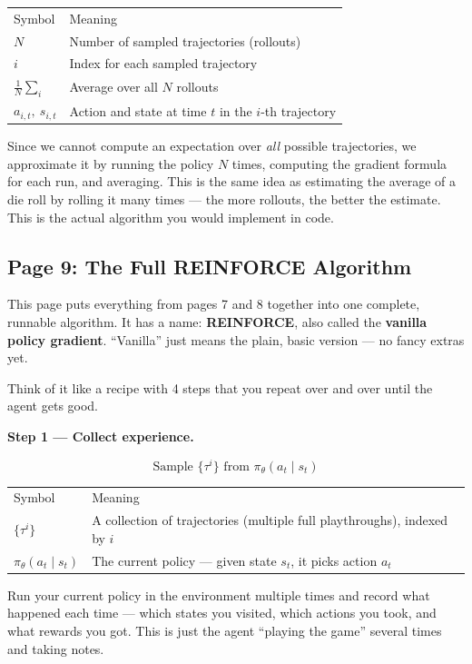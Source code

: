 \begin{tabular}{ll}
  Symbol & Meaning \\[4pt]
  $N$ & Number of sampled trajectories (rollouts) \\
  $i$ & Index for each sampled trajectory \\
  $\frac{1}{N}\sum_i$ & Average over all $N$ rollouts \\
  $a_{i,t},\ s_{i,t}$ & Action and state at time $t$ in the $i$-th trajectory \\
\end{tabular}

\medskip
Since we cannot compute an expectation over \textit{all} possible trajectories, we approximate
it by running the policy $N$ times, computing the gradient formula for each run, and averaging.
This is the same idea as estimating the average of a die roll by rolling it many times --- the
more rollouts, the better the estimate. This is the actual algorithm you would implement in
code.


\subsection{Page 9: The Full REINFORCE Algorithm}

This page puts everything from pages 7 and 8 together into one complete, runnable algorithm.
It has a name: \textbf{REINFORCE}, also called the \textbf{vanilla policy gradient}.
``Vanilla'' just means the plain, basic version --- no fancy extras yet.

Think of it like a recipe with 4 steps that you repeat over and over until the agent gets good.

\medskip
\textbf{Step 1 --- Collect experience.}

\[
  \text{Sample } \{\tau^i\} \text{ from } \pi_\theta(a_t\mid s_t)
\]

\begin{tabular}{ll}
  Symbol & Meaning \\[4pt]
  $\{\tau^i\}$ & A collection of trajectories (multiple full playthroughs), indexed by $i$ \\
  $\pi_\theta(a_t\mid s_t)$ & The current policy --- given state $s_t$, it picks action $a_t$ \\
\end{tabular}

\medskip
Run your current policy in the environment multiple times and record what happened each time ---
which states you visited, which actions you took, and what rewards you got. This is just the
agent ``playing the game'' several times and taking notes.

